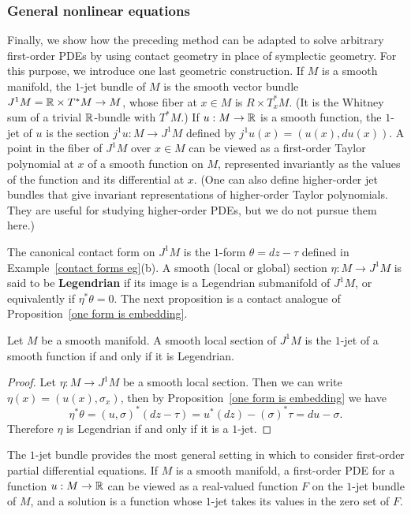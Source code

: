 \subsubsection{General nonlinear equations}
Finally, we show how the preceding method can be adapted to solve arbitrary first-order PDEs by using contact geometry in place of symplectic geometry. For this purpose, we introduce one last geometric construction. If $M$ is a smooth manifold, the $1$-jet bundle of $M$ is the smooth vector bundle $J^1M=\mathbb{R}\times T^*M\to M$, whose fiber at $x\in M$ is $R\times T_x^*M$. (It is the Whitney sum of a trivial $\mathbb{R}$-bundle with $T^*M$.) If $u:M\to\mathbb{R}$ is a smooth function, the $1$-jet of $u$ is the section $j^1u:M\to J^1M$ defined by $j^1u(x)=(u(x),du(x))$. A point in the fiber of $J^1M$ over $x\in M$ can be viewed as a first-order Taylor polynomial at $x$ of a smooth function on $M$, represented invariantly as the values of the function and its differential at $x$. (One can also define higher-order jet bundles that give invariant representations of higher-order Taylor polynomials. They are useful for studying higher-order PDEs, but we do not pursue them here.)\par
The canonical contact form on $J^1M$ is the $1$-form $\theta=dz-\tau$ defined in Example~\ref{contact forms eg}(b). A smooth (local or global) section $\eta:M\to J^1M$ is said to be \textbf{Legendrian} if its image is a Legendrian submanifold of $J^1M$, or equivalently if $\eta^*\theta=0$. The next proposition is a contact analogue of Proposition~\ref{one form is embedding}.
\begin{proposition}
Let $M$ be a smooth manifold. A smooth local section of $J^1M$ is the $1$-jet of a smooth function if and only if it is Legendrian.
\end{proposition}
\begin{proof}
Let $\eta:M\to J^1M$ be a smooth local section. Then we can write $\eta(x)=(u(x),\sigma_x)$, then by Proposition~\ref{one form is embedding} we have
\[\eta^*\theta=(u,\sigma)^*(dz-\tau)=u^*(dz)-(\sigma)^*\tau=du-\sigma.\]
Therefore $\eta$ is Legendrian if and only if it is a $1$-jet.
\end{proof}
The $1$-jet bundle provides the most general setting in which to consider first-order partial differential equations. If $M$ is a smooth manifold, a first-order PDE for a function $u:M\to\mathbb{R}$ can be viewed as a real-valued function $F$ on the $1$-jet bundle of $M$, and a solution is a function whose $1$-jet takes its values in the zero set of $F$.\par
